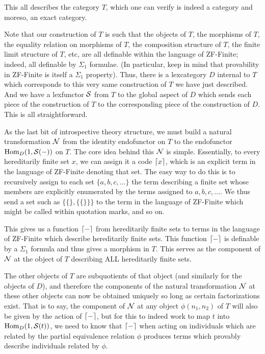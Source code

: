\documentclass[./main.tex]{subfiles}
\begin{document}
This all describes the category $T$, which one can verify is indeed a category and moreso, an exact category.

Note that our construction of $T$ is such that the objects of $T$, the morphisms of $T$, the equality relation on morphisms of $T$, the composition structure of $T$, the finite limit structure of $T$, etc, are all definable within the language of ZF-Finite; indeed, all definable by $\Sigma_1$ formulae. (In particular, keep in mind that provability in ZF-Finite is itself a $\Sigma_1$ property). Thus, there is a lexcategory $D$ internal to $T$ which corresponds to this very same construction of $T$ we have just described. And we have a lexfunctor $\mathcal{S}$ from $T$ to the global aspect of $D$ which sends each piece of the construction of $T$ to the corresponding piece of the construction of $D$. This is all straightforward.

As the last bit of introspective theory structure, we must build a natural transformation $\mathcal{N}$ from the identity endofunctor on $T$ to the endofunctor $\operatorname{Hom}_D(1, \mathcal{S}(-))$ on $T$. The core idea behind this $\mathcal{N}$ is simple. Essentially, to every hereditarily finite set $x$, we can assign it a code $\lceil x \rceil$, which is an explicit term in the language of ZF-Finite denoting that set. The easy way to do this is to recursively assign to each set $\{a, b, c, \ldots\}$ the term describing a finite set whose members are explicitly enumerated by the terms assigned to $a, b, c, \ldots$. We thus send a set such as $\{\{\}, \{\{\}\}\}$ to the term in the language of ZF-Finite which might be called \quote{$\{\{\}, \{\{\}\}\}$} within quotation marks, and so on. 

This gives us a function $\lceil - \rceil$ from hereditarily finite sets to terms in the language of ZF-Finite which describe hereditarily finite sets. This function $\lceil - \rceil$ is definable by a $\Sigma_1$ formula and thus gives a morphism in $T$. This serves as the component of $\mathcal{N}$ at the object of $T$ describing ALL hereditarily finite sets. 

The other objects of $T$ are subquotients of that object (and similarly for the objects of $D$), and therefore the components of the natural transformation $\mathcal{N}$ at these other objects can now be obtained uniquely so long as certain factorizations exist. That is to say, the component of $\mathcal{N}$ at any object $\phi(n_1, n_2)$ of $T$ will also be given by the action of $\lceil - \rceil$, but for this to indeed work to map $t$ into $\operatorname{Hom}_D(1, \mathcal{S}(t))$, we need to know that $\lceil - \rceil$ when acting on individuals which are related by the partial equivalence relation $\phi$ produces terms which provably describe individuals related by $\phi$.
\end{document}
